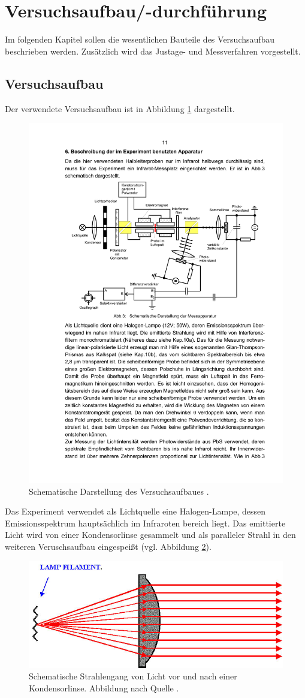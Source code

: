 \section{Versuchsaufbau/-durchführung}
Im folgenden Kapitel sollen die wesentlichen Bauteile des Versuchsaufbau beschrieben
werden. Zusätzlich wird das Justage- und Messverfahren vorgestellt.

\subsection{Versuchsaufbau}
\FloatBarrier
Der verwendete Versuchsaufbau ist in Abbildung \ref{fig:aufbau} dargestellt.
\begin{figure}
\centering
\includegraphics[width=0.7\linewidth]{./content/images/aufbau.pdf}
\caption{Schematische Darstellung des Versuchsaufbaues \cite{anleitungv46}.}
\label{fig:aufbau}
\end{figure}
Das Experiment verwendet als Lichtquelle eine Halogen-Lampe, dessen Emissionsspektrum
hauptsächlich im Infraroten bereich liegt. Das emittierte Licht wird von einer
Kondensorlinse gesammelt und als paralleler Strahl in den weiteren Veruschsaufbau
eingespeißt (vgl. Abbildung \ref{fig:kondensorlinse}).
\begin{figure}
\centering
\includegraphics[width=0.45\linewidth]{./content/images/condensor.JPG}
\caption{Schematische Strahlengang von Licht vor und nach einer Kondensorlinse.
Abbildung nach Quelle \cite{kondensorlinse}.}
\label{fig:kondensorlinse}
\end{figure}
